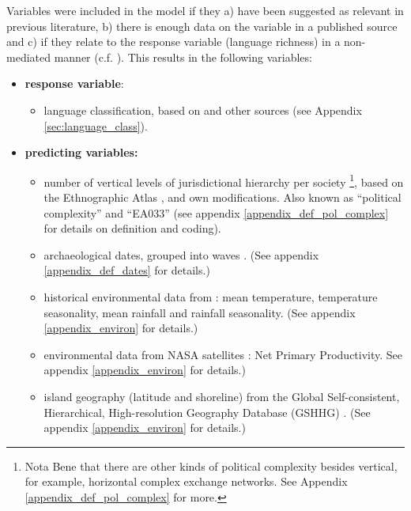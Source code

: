 \documentclass[a4paper,10pt]{article} %
\begin{document}
Variables were included in the model if they a) have been suggested as relevant in previous literature, b) there is enough data on the variable in a published source and c) if they relate to the response variable (language richness) in a non-mediated manner (c.f. \citet{pearl1995causal}). This results in the following variables:

\begin{itemize}
\item \textbf{response variable}:
\begin{itemize}
\item language classification, based on \citet{glottolog40} and other sources (see Appendix \ref{sec:language_class}).
\end{itemize}
\item \textbf{predicting variables:}
\begin{itemize}
\item number of vertical levels of jurisdictional hierarchy per society \footnote{Nota Bene that there are other kinds of political complexity besides vertical, for example, horizontal complex exchange networks. See Appendix \ref{appendix_def_pol_complex} for more.}, based on the Ethnographic Atlas \citep{gray1998ethnographic, d_place_all}, \citet{sheehan2018coevolution} and own modifications. Also known as ``political complexity'' and ``EA033'' (see appendix \ref{appendix_def_pol_complex} for details on definition and coding).
\item archaeological dates, grouped into waves \citep{intoh2007reconnaissance, intoh2008ongoing, rieth_cochrane_2018, levin_seikel_miles_2019, pol_outliers_stat_art, Napolitano_et_al_yap}. (See appendix \ref{appendix_def_dates} for details.)
\item historical environmental data from \citet{ecoclimate}: mean temperature, temperature seasonality, mean rainfall and rainfall seasonality. (See appendix \ref{appendix_environ} for details.)
\item environmental data from NASA satellites \citep{running2021modis_aqua, running2021modis_terra}: Net Primary Productivity. See appendix \ref{appendix_environ} for details.)
\item island geography (latitude and shoreline) from the Global Self-consistent, Hierarchical, High-resolution Geography Database (GSHHG) \citep{wessel1996global}.  (See appendix \ref{appendix_environ} for details.)
\end{itemize}
\end{itemize}
\end{document}

